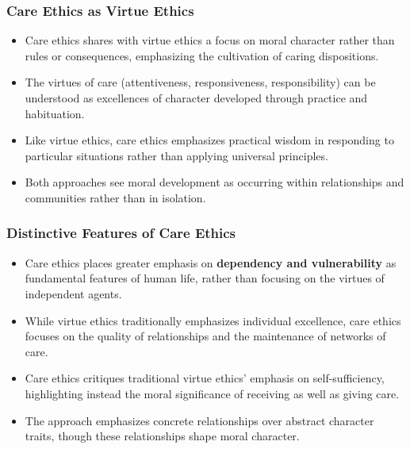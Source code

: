 \documentclass{beamer}
\begin{document}
\begin{frame}
    \frametitle{Care Ethics as Virtue Ethics}
    \begin{itemize}
        \item Care ethics shares with virtue ethics a focus on moral character rather than rules or consequences, emphasizing the cultivation of caring dispositions.
        
        \item The virtues of care (attentiveness, responsiveness, responsibility) can be understood as excellences of character developed through practice and habituation.
        
        \item Like virtue ethics, care ethics emphasizes practical wisdom in responding to particular situations rather than applying universal principles.
        
        \item Both approaches see moral development as occurring within relationships and communities rather than in isolation.
    \end{itemize}
\end{frame}

\begin{frame}
    \frametitle{Distinctive Features of Care Ethics}
    \begin{itemize}
        \item Care ethics places greater emphasis on \textbf{dependency and vulnerability} as fundamental features of human life, rather than focusing on the virtues of independent agents.
        
        \item While virtue ethics traditionally emphasizes individual excellence, care ethics focuses on the quality of relationships and the maintenance of networks of care.
        
        \item Care ethics critiques traditional virtue ethics' emphasis on self-sufficiency, highlighting instead the moral significance of receiving as well as giving care.
        
        \item The approach emphasizes concrete relationships over abstract character traits, though these relationships shape moral character.
    \end{itemize}
\end{frame}
\end{document}
